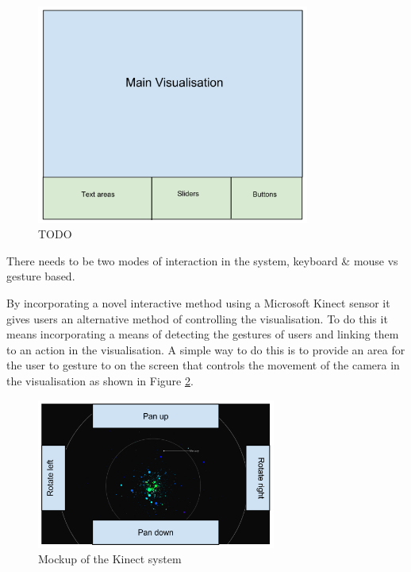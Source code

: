 \begin{enumerate}
\begin{figure}[H]
  \centering
      \includegraphics[width=0.8\textwidth]{images/clutter.pdf}
  \caption{TODO}
  \label{fig:clutter}
\end{figure}

\clearpage
{\bf  \item[R8.] There needs to be two modes of interaction in the system,
keyboard \& mouse vs gesture based.}

By
incorporating a novel interactive method using a Microsoft Kinect sensor it
gives users an alternative method of controlling the visualisation. To do this it means incorporating a
means of detecting the gestures of users and linking them to an action in the
visualisation. A simple way to do this is to provide an area for the user to
gesture to on the screen that controls the movement of the camera in the
visualisation as shown in Figure \ref{fig:kinectMock}.
\begin{figure}[H]
  \centering
      \includegraphics[width=0.7\textwidth]{images/mockKinect.png}
  \caption{Mockup of the Kinect system}
  \label{fig:kinectMock}
\end{figure}


\end{enumerate}
